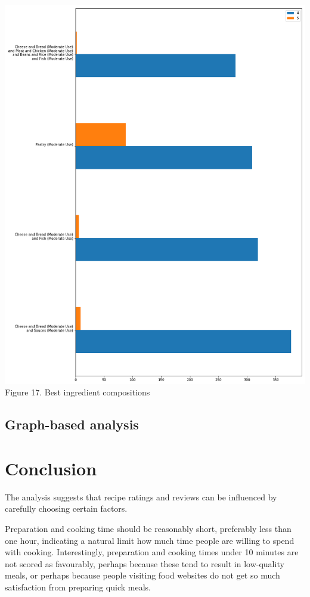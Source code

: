 \documentclass[11pt]{article}
\begin{document}
\vspace{5mm}
\begin{center}
\includegraphics[scale=0.18]{ingredient-rating} \\
\label{ingredient-rating} Figure 17. Best ingredient compositions
\end{center}
\vspace{5mm}

\subsection{Graph-based analysis}


\section{Conclusion}

The analysis suggests that recipe ratings and reviews can be influenced by carefully choosing certain factors. 

Preparation and cooking time should be reasonably short, preferably less than one hour, indicating a natural limit how much time people are willing to spend with cooking. Interestingly, preparation and cooking times under 10 minutes are not scored as favourably, perhaps because these tend to result in low-quality meals, or perhaps because people visiting food websites do not get so much satisfaction from preparing quick meals.
\end{document}
